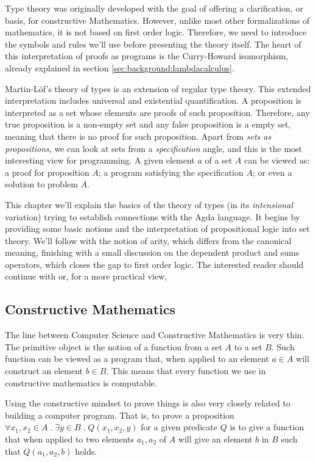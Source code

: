 Type theory was originally developed with the goal of offering a clarification, or basis,
for constructive Mathematics. However, unlike most other formalizations of mathematics, it is
not based on first order logic. Therefore, we need to introduce the symbols and
rules we'll use before presenting the theory itself. The heart of this interpretation of
proofs as programs is the Curry-Howard isomorphism, already explained in section \ref{sec:background:lambdacalculus}.

Martin-L\"{o}f's theory of types \cite{lof84} is an extension of regular type theory. This extended
interpretation includes universal and existential quantification. 
A proposition is interpreted as a set whose elements
are proofs of such proposition. Therefore, any true proposition is a non-empty set and any false proposition
is a empty set, meaning that there is no proof for such proposition. Apart from \emph{sets as propositions},
we can look at sets from a \emph{specification} angle, and this is the most interesting view for programming.
A given element $a$ of a set $A$ can be viewed as: a proof for proposition $A$; a program satisfying the
specification $A$; or even a solution to problem $A$.

This chapter we'll explain the basics of the theory of types (in its \emph{intensional} variation)
trying to establish connections with the Agda language. It begins by providing some basic notions
and the interpretation of propositional logic into set theory. We'll follow with the notion of arity,
which differs from the canonical meaning, finishing with a small discussion on the dependent product
and sums operators, which closes the gap to first order logic. The interested reader should continue
with \cite{nords90} or, for a more practical view, \cite{wouter08,bove2009}

\subsection{Constructive Mathematics}
\label{subsec:martinlof:constructivemathematics}

The line between Computer Science and Constructive Mathematics is very thin. The primitive object is
the notion of a function from a set $A$ to a set $B$. Such function can be viewed as a program that,
when applied to an element $a \in A$ will construct an element $b \in B$. This means that every
function we use in constructive mathematics is computable. 

Using the constructive mindset to prove things is also very closely related to building a computer program.
That is, to prove a proposition $\forall x_1,x_2 \in A \; . \; \exists y \in B \; . \; Q(x_1, x_2, y)$ for a given
predicate $Q$ is to give a function that when applied to two elements $a_1, a_2$ of $A$ will give an element $b$ in $B$
such that $Q(a_1, a_2, b)$ holds. 

